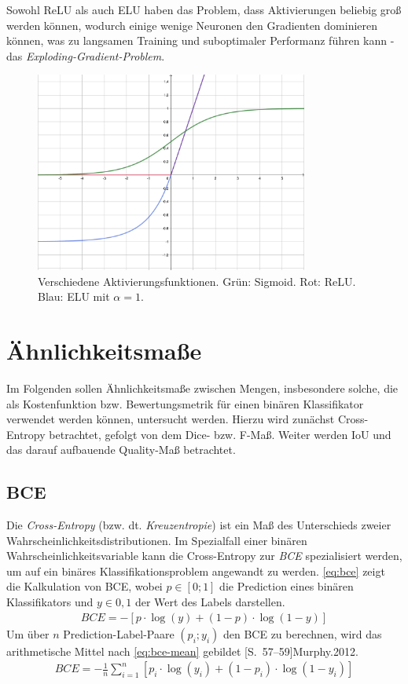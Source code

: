 Sowohl \ac{ReLU} als auch \ac{ELU} haben das Problem, dass Aktivierungen beliebig groß werden können, 
wodurch einige wenige Neuronen den Gradienten dominieren können, was zu langsamen Training und suboptimaler Performanz führen kann - das \textit{Exploding-Gradient-Problem}. 
\begin{figure}
	\centering
	\includegraphics[width=0.8\textwidth]{Bilder/activation-geogebra-export.pdf} 
	\caption{Verschiedene Aktivierungsfunktionen. Grün: Sigmoid. Rot: \ac{ReLU}. Blau: \ac{ELU} mit $\alpha = 1$.}
	\label{fig:activation}
\end{figure} 


\section{Ähnlichkeitsmaße}

Im Folgenden sollen Ähnlichkeitsmaße zwischen Mengen, insbesondere 
solche, die als Kostenfunktion bzw. Bewertungsmetrik für einen binären 
Klassifikator verwendet werden können, untersucht werden. Hierzu wird zunächst Cross-Entropy betrachtet,
gefolgt von dem Dice- bzw. F-Maß. Weiter werden \ac{IoU} und das darauf aufbauende Quality-Maß betrachtet.

\subsection{\acf{BCE}}

Die \textit{Cross-Entropy} (bzw. dt. \textit{Kreuzentropie}) ist ein Maß des Unterschieds zweier
Wahrscheinlichkeitsdistributionen. Im Spezialfall einer binären Wahrscheinlichkeitsvariable 
kann die Cross-Entropy zur \textit{\acf{BCE}} spezialisiert werden, um auf ein binäres 
Klassifikationsproblem angewandt zu werden. 
\autoref{eq:bce} zeigt die Kalkulation von \ac{BCE}, wobei $p \in [0;1]$ die Prediction 
eines binären Klassifikators und $y \in {0,1}$ der Wert des Labels darstellen.
\begin{align}
	\label{eq:bce} BCE = -[p \cdot \log(y) + (1-p) \cdot \log(1-y) ]
\end{align} 
Um über $n$ Prediction-Label-Paare $(p_i; y_i)$ den \ac{BCE} zu berechnen, wird das arithmetische Mittel nach
\autoref{eq:bce-mean} gebildet \cite[S.~82]{Cybenko.1999}[S.~57--59]{Murphy.2012}.
\begin{align}
	\label{eq:bce-mean} BCE = -\frac{1}{n}\sum_{i = 1}^{n}[p_i \cdot \log(y_i) + (1-p_i) \cdot \log(1-y_i) ]
\end{align}

